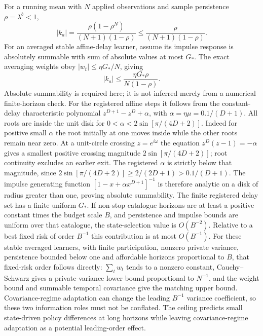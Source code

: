 For a running mean with $N$ applied observations and sample persistence $\rho=\lambda^b<1$,
\[
|k_a|=\frac{\rho(1-\rho^N)}{(N+1)(1-\rho)}
\le\frac{\rho}{(N+1)(1-\rho)}.
\]
For an averaged stable affine-delay learner, assume its impulse response is absolutely summable with sum of absolute values at most $G_*$.
The exact averaging weights obey $|w_t|\le\eta G_*/N$, giving
\[
|k_a|\le\frac{\eta G_*\rho}{N(1-\rho)}.
\]
Absolute summability is required here; it is not inferred merely from a numerical finite-horizon check.
For the registered affine steps it follows from the constant-delay characteristic polynomial $z^{D+1}-z^D+\alpha$, with $\alpha=\eta\mu=0.1/(D+1)$.
All roots are inside the unit disk for $0<\alpha<2\sin[\pi/(4D+2)]$.
Indeed for positive small $\alpha$ the root initially at one moves inside while the other roots remain near zero.
At a unit-circle crossing $z=e^{i\omega}$ the equation $z^D(z-1)=-\alpha$ gives a smallest positive crossing magnitude $2\sin[\pi/(4D+2)]$; root continuity excludes an earlier exit.
The registered $\alpha$ is strictly below that magnitude, since $2\sin[\pi/(4D+2)]\ge2/(2D+1)>0.1/(D+1)$.
The impulse generating function $[1-x+\alpha x^{D+1}]^{-1}$ is therefore analytic on a disk of radius greater than one, proving absolute summability.
The finite registered delay set has a finite uniform $G_*$.
If non-stop catalogue horizons are at least a positive constant times the budget scale $B$, and persistence and impulse bounds are uniform over that catalogue, the state-selection value is $O(B^{-2})$.
Relative to a best fixed risk of order $B^{-1}$ this contribution is at most $O(B^{-1})$.
For these stable averaged learners, with finite participation, nonzero private variance, persistence bounded below one and affordable horizons proportional to $B$, that fixed-risk order follows directly: $\sum_tw_t$ tends to a nonzero constant, Cauchy--Schwarz gives a private-variance lower bound proportional to $N^{-1}$, and the weight bound and summable temporal covariance give the matching upper bound.
Covariance-regime adaptation can change the leading $B^{-1}$ variance coefficient, so these two information roles must not be conflated.
The ceiling predicts small state-driven policy differences at long horizons while leaving covariance-regime adaptation as a potential leading-order effect.
